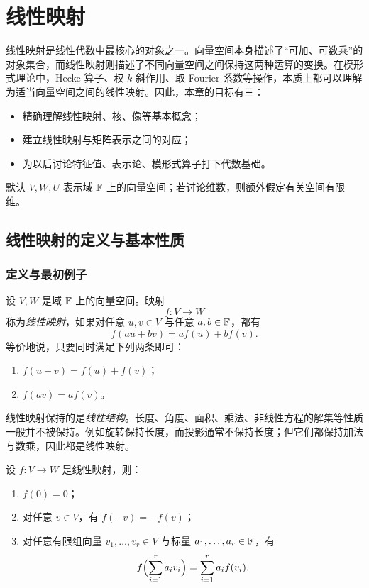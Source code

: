 \chapter{线性映射}

线性映射是线性代数中最核心的对象之一。向量空间本身描述了“可加、可数乘”的对象集合，而线性映射则描述了不同向量空间之间保持这两种运算的变换。在模形式理论中，Hecke 算子、权 $k$ 斜作用、取 Fourier 系数等操作，本质上都可以理解为适当向量空间之间的线性映射。因此，本章的目标有三：
\begin{itemize}
  \item 精确理解线性映射、核、像等基本概念；
  \item 建立线性映射与矩阵表示之间的对应；
  \item 为以后讨论特征值、表示论、模形式算子打下代数基础。
\end{itemize}

默认 $V,W,U$ 表示域 $\mathbb{F}$ 上的向量空间；若讨论维数，则额外假定有关空间有限维。

\section{线性映射的定义与基本性质}

\subsection{定义与最初例子}

\begin{definition}
设 $V,W$ 是域 $\mathbb{F}$ 上的向量空间。映射
\[
  f\colon V\to W
\]
称为\emph{线性映射}，如果对任意 $u,v\in V$ 与任意 $a,b\in \mathbb{F}$，都有
\[
  f(au+bv)=af(u)+bf(v).
\]
等价地说，只要同时满足下列两条即可：
\begin{enumerate}[label=\textnormal{(\arabic*)}]
  \item $f(u+v)=f(u)+f(v)$；
  \item $f(av)=af(v)$。
\end{enumerate}
\end{definition}

\begin{remark}
线性映射保持的是\emph{线性结构}。长度、角度、面积、乘法、非线性方程的解集等性质一般并不被保持。例如旋转保持长度，而投影通常不保持长度；但它们都保持加法与数乘，因此都是线性映射。
\end{remark}

\begin{proposition}
设 $f\colon V\to W$ 是线性映射，则：
\begin{enumerate}[label=\textnormal{(\arabic*)}]
  \item $f(0)=0$；
  \item 对任意 $v\in V$，有 $f(-v)=-f(v)$；
  \item 对任意有限组向量 $v_1,\dots,v_r\in V$ 与标量 $a_1,\dots,a_r\in\mathbb{F}$，有
  \[
    f\Bigl(\sum_{i=1}^r a_i v_i\Bigr)=\sum_{i=1}^r a_i f(v_i).
  \]
\end{enumerate}
\end{proposition}

